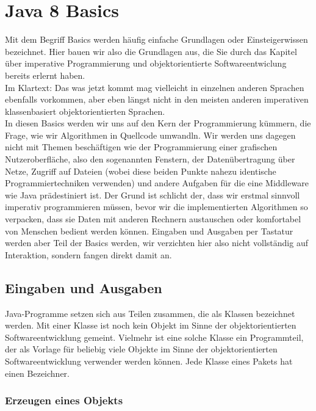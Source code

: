 \chapter{Java 8 Basics}

Mit dem Begriff Basics werden häufig einfache Grundlagen oder Einsteigerwissen bezeichnet. Hier bauen wir also die Grundlagen aus, die Sie durch das Kapitel über imperative Programmierung und objektorientierte Softwareentwiclung bereits erlernt haben.\\

Im Klartext: Das was jetzt kommt mag vielleicht in einzelnen anderen Sprachen ebenfalls vorkommen, aber eben längst nicht in den meisten anderen imperativen klassenbasiert objektorientierten Sprachen.\\

In diesen Basics werden wir uns auf den Kern der Programmierung kümmern, die Frage, wie wir Algorithmen in Quellcode umwandln. Wir werden uns dagegen nicht mit Themen beschäftigen wie der Programmierung einer grafischen Nutzeroberfläche, also den sogenannten \glqq{}Fenstern\grqq{}, der Datenübertragung über Netze, Zugriff auf Dateien (wobei diese beiden Punkte nahezu identische Programmiertechniken verwenden) und andere Aufgaben für die eine Middleware wie Java prädestiniert ist. Der Grund ist schlicht der, dass wir erstmal sinnvoll imperativ programmieren müssen, bevor wir die implementierten Algorithmen so verpacken, dass sie Daten mit anderen Rechnern austauschen oder komfortabel von Menschen bedient werden können. Eingaben und Ausgaben per Tastatur werden aber Teil der Basics werden, wir verzichten hier also nicht vollständig auf Interaktion, sondern fangen direkt damit an.

\section{Eingaben und Ausgaben}

Java-Programme setzen sich aus Teilen zusammen, die als Klassen bezeichnet werden. Mit einer Klasse ist noch kein Objekt im Sinne der objektorientierten Softwareentwicklung gemeint. Vielmehr ist eine solche Klasse ein Programmteil, der als Vorlage für beliebig viele Objekte im Sinne der objektorientierten Softwareentwicklung verwender werden können. Jede Klasse eines Pakets hat einen Bezeichner.

\subsection{Erzeugen eines Objekts}

